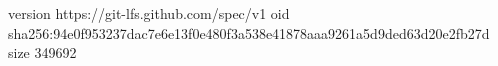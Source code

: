 version https://git-lfs.github.com/spec/v1
oid sha256:94e0f953237dac7e6e13f0e480f3a538e41878aaa9261a5d9ded63d20e2fb27d
size 349692
